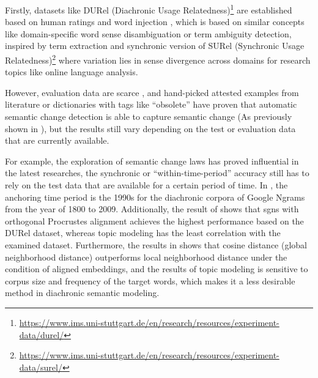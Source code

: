 Firstly, datasets like DURel (Diachronic Usage Relatedness)\footnote{\url{https://www.ims.uni-stuttgart.de/en/research/resources/experiment-data/durel/}} are established based on human ratings \parencite{schlechtweg2018diachronic} and word injection \parencite{schlechtweg2019wind}, which is based on similar concepts like domain-specific word sense disambiguation or term ambiguity detection, inspired by term extraction and synchronic version of SURel (Synchronic Usage Relatedness)\footnote{\url{https://www.ims.uni-stuttgart.de/en/research/resources/experiment-data/surel/}} where variation lies in sense divergence across domains for research topics like online language analysis.

However, evaluation data are scarce \parencite{wevers2020digital}, and hand-picked attested examples from literature or dictionaries with tags like ``obsolete'' \parencite{hamilton2016cultural} have proven that automatic semantic change detection is able to capture semantic change \parencite{schlechtweg2019wind} (As previously shown in ), but the results still vary depending on the test or evaluation data that are currently available.

For example, the exploration of semantic change laws has proved influential in the latest researches, the synchronic or ``within-time-period'' accuracy still has to rely on the test data that are available for a certain period of time. In \textcite{hamilton2016law}, the anchoring time period is the 1990s for the diachronic corpora of Google Ngrams from the year of 1800 to 2009. Additionally, the result of \textcite{schlechtweg2019wind} shows that \gls{sgns} with orthogonal Procrustes alignment achieves the highest performance based on the DURel dataset, whereas topic modeling has the least correlation with the examined dataset. Furthermore, the results in \textcite{schlechtweg2019wind, dubossarsky2017outta} shows that cosine distance (global neighborhood distance) outperforms local neighborhood distance under the condition of aligned embeddings, and the results of topic modeling is sensitive to corpus size and frequency of the target words, which makes it a less desirable method in diachronic semantic modeling.


